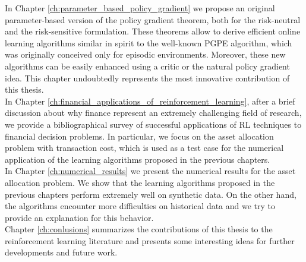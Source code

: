 In Chapter \ref{ch:parameter_based_policy_gradient} we propose an original parameter-based version of the policy gradient theorem, both for the risk-neutral and the risk-sensitive formulation. These theorems allow to derive efficient online learning algorithms similar in spirit to the well-known PGPE algorithm, which was originally conceived only for episodic environments. Moreover, these new algorithms can be easily enhanced using a critic or the natural policy gradient idea. This chapter undoubtedly represents the most innovative contribution of this thesis.\\ 
In Chapter \ref{ch:financial_applications_of_reinforcement_learning}, after a brief discussion about why finance represent an extremely challenging field of research, we provide a bibliographical survey of successful applications of RL techniques to financial decision problems. In particular, we focus on the asset allocation problem with transaction cost, which is used as a test case for the numerical application of the learning algorithms proposed in the previous chapters.\\
In Chapter \ref{ch:numerical_results} we present the numerical results for the asset allocation problem. We show that the learning algorithms proposed in the previous chapters perform extremely well on synthetic data. On the other hand, the algorithms encounter more difficulties on historical data and we try to provide an explanation for this behavior.\\
Chapter \ref{ch:conlusions} summarizes the contributions of this thesis to the reinforcement learning literature and presents some interesting ideas for further developments and future work.\\
 


